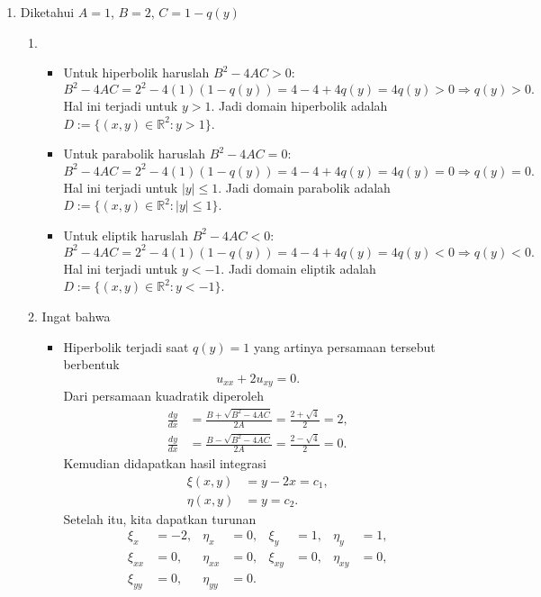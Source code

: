 \documentclass[a4paper]{article}
\theoremstyle{definition}
\begin{document}
\begin{enumerate}
  \item Diketahui $A= 1$, $B = 2$, $C = 1 - q(y)$
  \begin{enumerate}
    \item 
    \begin{itemize}
      \item Untuk hiperbolik haruslah $B^2 - 4AC > 0$:
      \[
      B^2 - 4AC = 2^2 - 4(1)(1 - q(y)) = 4 - 4 + 4q(y) = 4q(y) > 0 \Rightarrow q(y) > 0.
      \]
      Hal ini terjadi untuk $y > 1$. Jadi domain hiperbolik adalah $D:= \{(x,y) \in \mathbb{R}^2 : y > 1\}$.
      \item Untuk parabolik haruslah $B^2 - 4AC = 0$:
      \[
      B^2 - 4AC = 2^2 - 4(1)(1 - q(y)) = 4 - 4 + 4q(y) = 4q(y) = 0 \Rightarrow q(y) = 0.
      \]
      Hal ini terjadi untuk $|y| \leq 1$. Jadi domain parabolik adalah $D:= \{(x,y) \in \mathbb{R}^2 : |y| \leq 1\}$.
      \item Untuk eliptik haruslah $B^2 - 4AC < 0$:
      \[
      B^2 - 4AC = 2^2 - 4(1)(1 - q(y)) = 4 - 4 + 4q(y) = 4q(y) < 0 \Rightarrow q(y) < 0.
      \]
      Hal ini terjadi untuk $y < -1$. Jadi domain eliptik adalah $D:= \{(x,y) \in \mathbb{R}^2 : y < -1\}$.
    \end{itemize}
    \item Ingat bahwa 
    \begin{itemize}
      \item Hiperbolik terjadi saat $q(y) = 1$ yang artinya persamaan tersebut berbentuk
      \[
      u_{xx} + 2u_{xy} = 0.
      \]
      Dari persamaan kuadratik diperoleh
      \begin{align*}
      \frac{dy}{dx} &= \frac{B + \sqrt{B^2 - 4AC}}{2A} = \frac{2 + \sqrt{4}}{2} = 2, \\
      \frac{dy}{dx} &= \frac{B - \sqrt{B^2 - 4AC}}{2A} = \frac{2 - \sqrt{4}}{2} = 0.
      \end{align*}
      Kemudian didapatkan hasil integrasi
      \begin{align*}
        \xi(x,y) &= y-2x = c_1, \\
        \eta(x,y) &= y = c_2.
      \end{align*}
      Setelah itu, kita dapatkan turunan
      \begin{align*}
        \xi_x &= -2, & \eta_x &= 0, &
        \xi_y &= 1, & \eta_y &= 1, \\
        \xi_{xx} &= 0, & \eta_{xx} &= 0, &
        \xi_{xy} &= 0, & \eta_{xy} &= 0, \\
        \xi_{yy} &= 0, & \eta_{yy} &= 0.

\end{align*}
\end{itemize}
\end{enumerate}
\end{enumerate}
\end{document}
